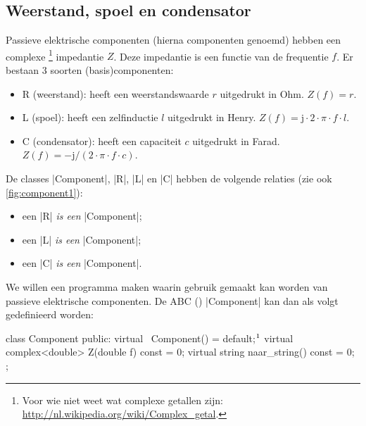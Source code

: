 \begin{cpplstShortInline}
\subsection{Weerstand, spoel en condensator}
Passieve elektrische componenten (hierna componenten genoemd) hebben een complexe%
\footnote{%
    Voor wie niet weet wat complexe getallen zijn: \url{http://nl.wikipedia.org/wiki/Complex_getal}.
} impedantie $Z$.
Deze impedantie is een functie van de frequentie $f$.
Er bestaan 3 soorten (basis)componenten:
\begin{itemize}
    \item R (weerstand): heeft een weerstandswaarde $r$ uitgedrukt in Ohm.
    $Z(f)=r$.
    \item  L (spoel): heeft een zelfinductie $l$ uitgedrukt in Henry.
    $Z(f) = \mathrm{j} \cdot 2 \cdot \pi \cdot f \cdot l$.
    \item C (condensator): heeft een capaciteit $c$ uitgedrukt in Farad.
    $Z(f) = -\mathrm{j} / (2 \cdot \pi \cdot f \cdot c)$.
\end{itemize}

De classes |Component|, |R|, |L| en |C| hebben de volgende relaties (zie ook \cref{fig:component1}):
\begin{itemize}
    \item een |R| \emph{is een} |Component|;
    \item een |L| \emph{is een} |Component|;
    \item een |C| \emph{is een} |Component|.
\end{itemize}

We willen een programma maken waarin gebruik gemaakt kan worden van passieve elektrische componenten.
De ABC () |Component| kan dan als volgt gedefinieerd worden:

\begin{cpplstfragment}[mathescape=true]
class Component {
public:
    virtual ~Component() = default;$\footnotemark$
    virtual complex<double> Z(double f) const = 0;
    virtual string naar_string() const = 0;
};
\end{cpplstfragment}




\end{cpplstShortInline}
